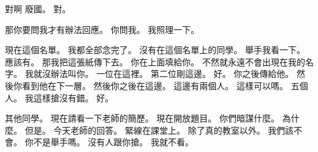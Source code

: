 \hypertarget{c01:cue:2676}{}對啊 廢國。
\hypertarget{c01:cue:2677}{}對。

\hypertarget{c01:cue:2678}{}那你要問我才有辦法回應。
\hypertarget{c01:cue:2679}{}你問我。
\hypertarget{c01:cue:2680}{}我照理一下。

\hypertarget{c01:cue:2681}{}現在這個名單。
\hypertarget{c01:cue:2682}{}我都全部念完了。
\hypertarget{c01:cue:2683}{}沒有在這個名單上的同學。
\hypertarget{c01:cue:2684}{}舉手我看一下。
\hypertarget{c01:cue:2685}{}應該有。
\hypertarget{c01:cue:2686}{}那我把這張紙傳下去。
\hypertarget{c01:cue:2687}{}你在上面填給你。
\hypertarget{c01:cue:2688}{}不然就永遠不會出現在我的名字。
\hypertarget{c01:cue:2689}{}我就沒辦法叫你。
\hypertarget{c01:cue:2690}{}一位在這裡。
\hypertarget{c01:cue:2691}{}第二位剛這邊。
\hypertarget{c01:cue:2692}{}好。
\hypertarget{c01:cue:2693}{}你之後傳給他。
\hypertarget{c01:cue:2694}{}然後你看到他在下一層。
\hypertarget{c01:cue:2695}{}然後你之後在這邊。
\hypertarget{c01:cue:2696}{}這邊有兩個人。
\hypertarget{c01:cue:2697}{}這樣可以嗎。
\hypertarget{c01:cue:2698}{}五個人。
\hypertarget{c01:cue:2699}{}我這樣搶沒有錯。
\hypertarget{c01:cue:2700}{}好。

\hypertarget{c01:cue:2701}{}其他同學。
\hypertarget{c01:cue:2702}{}現在請看一下老師的簡歷。
\hypertarget{c01:cue:2703}{}現在開放題目。
\hypertarget{c01:cue:2704}{}你們暗謀什麼。
\hypertarget{c01:cue:2705}{}為什麼。
\hypertarget{c01:cue:2706}{}但是。
\hypertarget{c01:cue:2707}{}今天老師的回答。
\hypertarget{c01:cue:2708}{}緊線在課堂上。
\hypertarget{c01:cue:2709}{}除了真的教室以外。
\hypertarget{c01:cue:2710}{}我們該不會。
\hypertarget{c01:cue:2711}{}你不是舉手嗎。
\hypertarget{c01:cue:2712}{}沒有人跟你搶。
\hypertarget{c01:cue:2713}{}我就不看。

